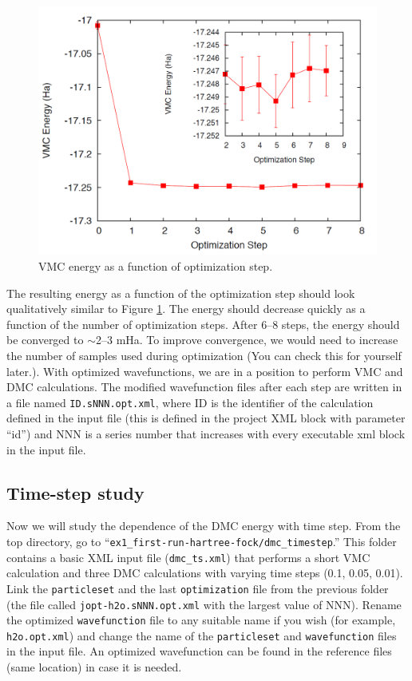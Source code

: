 \begin{figure}
\begin{center}
\includegraphics[trim = 0mm 0mm 0mm 0mm, clip,width=0.75\columnwidth]{./figures/lab_advanced_molecules_opt_conv.png}
\end{center}
\caption{VMC energy as a function of optimization step.}
\label{fig:lam_opt_conv}
\end{figure}

The resulting energy as a function of the optimization step should look qualitatively similar to Figure \ref{fig:lam_opt_conv}.
The energy should decrease quickly as a function of the number of optimization steps. After 6--8 steps, the energy should be converged to $\sim$2--3 mHa. To improve convergence,
we would need to increase the number of samples used during optimization (You can
check this for yourself later.). With optimized wavefunctions, we are in a position
to perform VMC and DMC calculations. The modified wavefunction files after each step
are written in a file named \texttt{ID.sNNN.opt.xml}, where ID is the identifier of the calculation
defined in the input file (this is defined in the project XML block with parameter “id”) and
NNN is a series number that increases with every executable xml block in the input file.


\subsection{Time-step study}
Now we will study the dependence of the DMC energy with time step. From the top directory, 
go to “\texttt{ex1\_first-run-hartree-fock/dmc\_timestep}.” This folder contains a basic XML input
file (\texttt{dmc\_ts.xml}) that performs a short VMC calculation and three DMC calculations
with varying time steps (0.1, 0.05, 0.01). Link the \texttt{particleset} and the last \texttt{optimization}
file from the previous folder (the file called \texttt{jopt-h2o.sNNN.opt.xml} with the largest value of
NNN). Rename the optimized \texttt{wavefunction} file to any suitable name if you wish (for example,
\texttt{h2o.opt.xml}) and change the name of the \texttt{particleset} and \texttt{wavefunction} files in the
input file. An optimized wavefunction can be found in the reference files (same location)
in case it is needed. %

